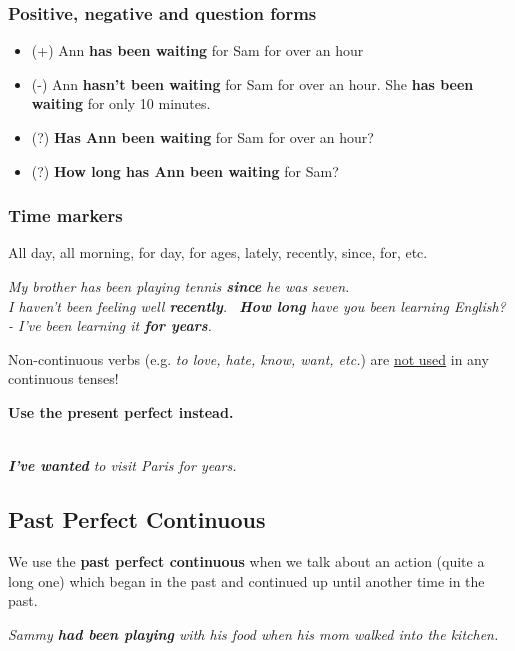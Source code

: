 \documentclass[hidelinks,10pt,a4paper]{article}
\begin{document}
\subsubsection{Positive, negative and question forms}
\begin{itemize}
	\item (+) Ann \textbf{has been waiting} for Sam for over an hour
	\item (-) Ann \textbf{hasn't been waiting} for Sam for over an hour. She \textbf{has been waiting} for only 10 minutes.
	\item (?) \textbf{Has Ann been waiting} for Sam for over an hour?
	\item (?) \textbf{How long has Ann been waiting} for Sam?
\end{itemize}

\subsubsection{Time markers}
All day, all morning, for day, for ages, lately, recently, since, for, etc.

\begin{center}
	\textit{My brother has been playing tennis \textbf{since} he was seven. \\
	I haven't been feeling well \textbf{recently}. \
	\textbf{How long} have you been learning English? - I've been learning it \textbf{for  years}.}
\end{center}

Non-continuous verbs (e.g. \textit{to love, hate, know, want, etc.}) are \underline{not used} in any continuous tenses!

\textbf{Use the present perfect instead.}

\begin{center}
	\textit{  \\
	\textbf{I've wanted} to visit Paris for years.}
\end{center}

\subsection{Past Perfect Continuous}
We use the \textbf{past perfect continuous} when we talk about an action (quite a long one) which began in the past and continued up until another time in the past.

\begin{center}
	\textit{Sammy \textbf{had been playing} with his food when his mom walked into the kitchen.}
\end{center}
\end{document}
